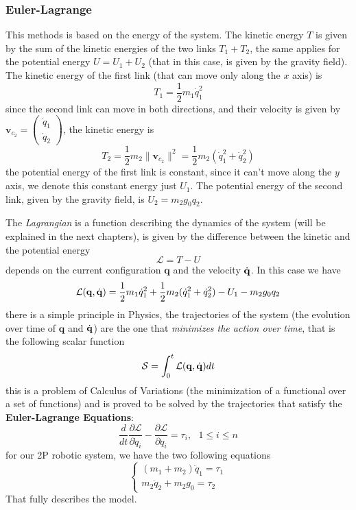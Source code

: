 \documentclass[10pt, a4paper]{report}
\begin{document}
\subsubsection{Euler-Lagrange}
This methods is based on the energy of the system. The kinetic energy $T$ is given by the sum of the kinetic energies of the two links $T_1+T_2$, the same applies for the potential energy $U=U_1+U_2$ (that in this case, is given by the gravity field). The kinetic energy of the first link (that can move only along the $x$ axis) is\begin{equation}
    T_1=\frac{1}{2}m_1\dot q_1^2 
\end{equation}
since the second link can move in both directions, and their velocity is given by $\mathbf v_{c_2}=\begin{pmatrix}
    \dot q_1\\ \dot q_2
\end{pmatrix}$, the kinetic energy is\begin{equation}
    T_2=\frac{1}{2}m_2\|\mathbf v_{c_2}\|^2=\frac{1}{2}m_2(\dot q_1^2+ \dot q_2^2)
\end{equation}
the potential energy of the first link is constant, since it can't move along the $y$ axis, we denote this constant energy just $U_1$. The potential energy of the second link, given by the gravity field, is $U_2=m_2g_0q_2$.\bigskip 

The \textit{Lagrangian} is a function describing the dynamics of the system (will be explained in the next chapters), is given by the difference between the kinetic and the potential energy\begin{equation}
    \mathcal L=T-U
\end{equation}
depends on the current configuration $\mathbf q$ and the velocity ${\dot{\mathbf q}}$. In this case we have\begin{equation}
    \mathcal L(\mathbf q,{\dot{\mathbf q}})=\frac{1}{2}m_1\dot q_1^2 +\frac{1}{2}m_2(\dot q_1^2+ \dot q_2^2)-U_1-m_2g_0q_2
\end{equation}
there is a simple principle in Physics, the trajectories of the system (the evolution over time of $\mathbf q$ and ${\dot{\mathbf q}}$) are the one that \textit{minimizes the action over time}, that is the following scalar function\begin{equation}
    \mathcal S=\int_0^t \mathcal L(\mathbf q,{\dot{\mathbf q}})dt
\end{equation}
this is a problem of Calculus of Variations (the minimization of a functional over a set of functions) and is proved to be solved by the trajectories that satisfy the \textbf{Euler-Lagrange Equations}:\begin{equation}
    \frac{d}{dt}\frac{\partial \mathcal L}{\partial \dot q_i}-\frac{\partial \mathcal L}{\partial q_i}=\tau_i, \ \ \ 1\le i\le n
\end{equation}
for our 2P robotic system, we have the two following equations\begin{equation}
    \begin{cases}
        (m_1+m_2)\ddot q_1=\tau_1\\ 
        m_2\ddot q_2+m_2g_0=\tau_2
    \end{cases}
\end{equation}
That fully describes the model.
\end{document}
